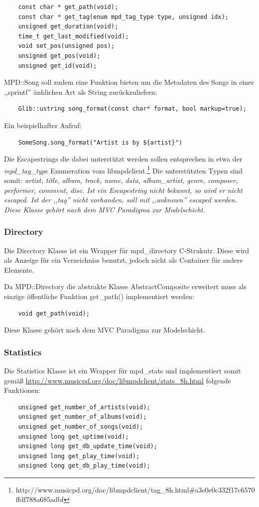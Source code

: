 \begin{verbatim}
    const char * get_path(void);
    const char * get_tag(enum mpd_tag_type type, unsigned idx);
    unsigned get_duration(void);
    time_t get_last_modified(void);
    void set_pos(unsigned pos);
    unsigned get_pos(void);
    unsigned get_id(void);
\end{verbatim}

MPD::Song soll zudem eine Funktion bieten um die Metadaten des Songs in einer ,,sprintf'' änhlichen Art als String zurückzuliefern:
\begin{verbatim}
    Glib::ustring song_format(const char* format, bool markup=true);
\end{verbatim}

Ein beispielhafter Aufruf:
\begin{verbatim}
    SomeSong.song_format("Artist is by ${artist}") 
\end{verbatim}

Die Escapestrings die dabei unterstützt werden sollen entsprechen in etwa der \textit{mpd\_tag\_type} Enumeration vom libmpdclient.\footnote{http://www.musicpd.org/doc/libmpdclient/tag\_8h.html\#a3e0e0c332f17c6570ffdf788a685adbf}
Die unterstützten Typen sind somit: \it artist, title, album, track, name, data, album\_artist, genre, composer, performer, comment, disc\rm.
Ist ein Escapestring nicht bekannt, so wird er nicht escaped. Ist der ,,tag'' nicht vorhanden, soll mit ,,unknown'' escaped werden.
\\
Diese Klasse gehört nach dem MVC Paradigma zur Modelschicht.

\subsubsection{Directory}
Die Directory Klasse ist ein Wrapper für mpd\_directory C-Strukutr. Diese wird als Anzeige für ein Verzeichniss benutzt, jedoch nicht als Container für andere Elemente.

Da MPD::Directory die abstrakte Klasse AbstractComposite erweitert muss als
einzige öffentliche Funktion get\_path() implementiert werden:
\begin{verbatim}
    void get_path(void);
\end{verbatim}

Diese Klasse gehört nach dem MVC Paradigma zur Modelschicht.

\newpage
\subsubsection{Statistics}
Die Statistics Klasse ist ein Wrapper für mpd\_stats und
implementiert somit gemäß \url{http://www.musicpd.org/doc/libmpdclient/stats\_8h.html}
folgende Funktionen:
\begin{verbatim}
    unsigned get_number_of_artists(void);
    unsigned get_number_of_albums(void);
    unsigned get_number_of_songs(void);
    unsigned long get_uptime(void);
    unsigned long get_db_update_time(void);
    unsigned long get_play_time(void);
    unsigned long get_db_play_time(void);
\end{verbatim}

